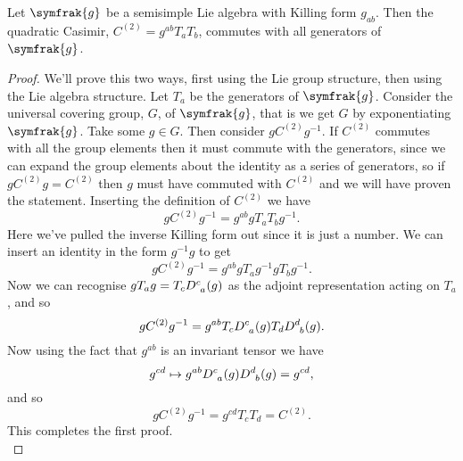 \documentclass[fleqn]{NotesClass}
\renewcommand{\lie}[1]{\symfrak{#1}}
\begin{document}
    \begin{lma}{}{}
        Let \(\lie{g}\) be a semisimple Lie algebra with Killing form \(g_{ab}\).
        Then the quadratic Casimir, \(C^{(2)} = g^{ab}T_aT_b\), commutes with all generators of \(\lie{g}\).
        
        \begin{proof}
            We'll prove this two ways, first using the Lie group structure, then using the Lie algebra structure.
            Let \(T_a\) be the generators of \(\lie{g}\).
            Consider the universal covering group, \(G\), of \(\lie{g}\), that is we get \(G\) by exponentiating \(\lie{g}\).
            Take some \(g \in G\).
            Then consider \(gC^{(2)}g^{-1}\).
            If \(C^{(2)}\) commutes with all the group elements then it must commute with the generators, since we can expand the group elements about the identity as a series of generators, so if \(gC^{(2)}g = C^{(2)}\) then \(g\) must have commuted with \(C^{(2)}\) and we will have proven the statement.
            Inserting the definition of \(C^{(2)}\) we have
            \begin{equation}
                gC^{(2)}g^{-1} = g^{ab} gT_aT_bg^{-1}.
            \end{equation}
            Here we've pulled the inverse Killing form out since it is just a number.
            We can insert an identity in the form \(g^{-1}g\) to get
            \begin{equation}
                gC^{(2)}g^{-1} = g^{ab}gT_ag^{-1}gT_bg^{-1}.
            \end{equation}
            Now we can recognise \(gT_ag = T_c \tensor{D}{^c_a}(g)\) as the adjoint representation acting on \(T_a\), and so
            \begin{equation}
                gC^{(2)}g^{-1} = g^{ab} T_c \tensor{D}{^c_a}(g) T_d\tensor{D}{^d_b}(g).
            \end{equation}
            Now using the fact that \(g^{ab}\) is an invariant tensor we have
            \begin{equation}
                g^{cd} \mapsto g^{ab} \tensor{D}{^c_a}(g)\tensor{D}{^d_b}(g) = g^{cd},
            \end{equation}
            and so
            \begin{equation}
                gC^{(2)}g^{-1} = g^{cd}T_cT_d = C^{(2)}.
            \end{equation}
            This completes the first proof.\\[1.5ex]

\end{proof}
\end{lma}
\end{document}
